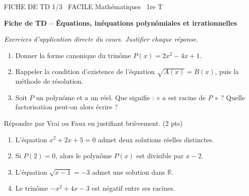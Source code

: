 \documentclass[11pt]{article}
\begin{document}
\begin{tcolorbox}[enhanced,colback=popink,colframe=popink,arc=10pt,boxrule=0pt,left=12pt,right=12pt,top=9pt,bottom=9pt]
{\color{white}\popxbold\small FICHE DE TD 1/3 \textbullet\ FACILE \hfill Mathématiques \textbullet\ 1re T\par}
\end{tcolorbox}
\vspace{4pt}
\textbf{Fiche de TD -- Équations, inéquations polynômiales et irrationnelles}

\smallskip
\emph{Exercices d'application directe du cours. Justifier chaque réponse.}

\begin{exercice}
\begin{enumerate}
  \item Donner la forme canonique du trinôme $P(x)=2x^2-4x+1$.
  \item Rappeler la condition d'existence de l'équation $\sqrt{A(x)}=B(x)$, puis la méthode de résolution.
  \item Soit $P$ un polynôme et $a$ un réel. Que signifie : « $a$ est racine de $P$ » ? Quelle factorisation peut-on alors écrire ?
\end{enumerate}
\end{exercice}

\begin{exercice}
Répondre par Vrai ou Faux en justifiant brièvement. \hfill(2 pts)
\begin{enumerate}
  \item L'équation $x^2+2x+5=0$ admet deux solutions réelles distinctes.
  \item Si $P(2)=0$, alors le polynôme $P(x)$ est divisible par $x-2$.
  \item L'équation $\sqrt{x-1}=-3$ admet une solution dans $\mathbb{R}$.
  \item Le trinôme $-x^2+4x-3$ est négatif entre ses racines.
\end{enumerate}
\end{exercice}
\end{document}
